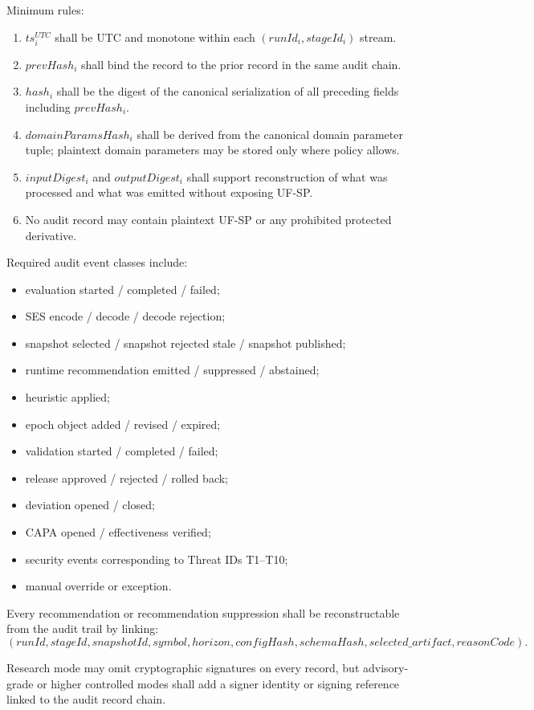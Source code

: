 \documentclass[11pt]{report}
\begin{document}
Minimum rules:
\begin{enumerate}[leftmargin=1.2cm]
\item $ts_i^{UTC}$ shall be UTC and monotone within each $(runId_i,stageId_i)$ stream.
\item $prevHash_i$ shall bind the record to the prior record in the same audit chain.
\item $hash_i$ shall be the digest of the canonical serialization of all preceding fields including $prevHash_i$.
\item $domainParamsHash_i$ shall be derived from the canonical domain parameter tuple; plaintext domain parameters may be stored only where policy allows.
\item $inputDigest_i$ and $outputDigest_i$ shall support reconstruction of what was processed and what was emitted without exposing UF-SP.
\item No audit record may contain plaintext UF-SP or any prohibited protected derivative.
\end{enumerate}

Required audit event classes include:
\begin{itemize}
\item evaluation started / completed / failed;
\item SES encode / decode / decode rejection;
\item snapshot selected / snapshot rejected stale / snapshot published;
\item runtime recommendation emitted / suppressed / abstained;
\item heuristic applied;
\item epoch object added / revised / expired;
\item validation started / completed / failed;
\item release approved / rejected / rolled back;
\item deviation opened / closed;
\item CAPA opened / effectiveness verified;
\item security events corresponding to Threat IDs T1--T10;
\item manual override or exception.
\end{itemize}

Every recommendation or recommendation suppression shall be reconstructable from the audit trail by linking:
\[
(runId,stageId,snapshotId,symbol,horizon,configHash,schemaHash,selected\_artifact,reasonCode).
\]

Research mode may omit cryptographic signatures on every record, but advisory-grade or higher controlled modes shall add a signer identity or signing reference linked to the audit record chain.
\end{document}
